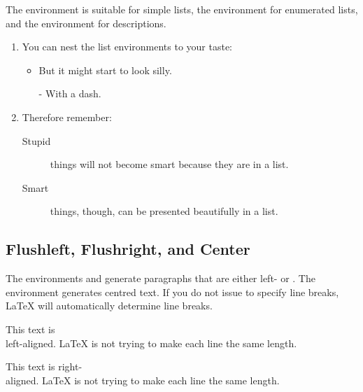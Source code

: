 The  environment is suitable for simple lists, the
 environment for enumerated lists, and the
 environment for descriptions.

\begin{example}
\flushleft
\begin{enumerate}
\item You can nest the list
environments to your taste:
\begin{itemize}
\item But it might start to
look silly.
\item[-] With a dash.
\end{itemize}
\item Therefore remember:
\begin{description}
\item[Stupid] things will not
become smart because they are
in a list.
\item[Smart] things, though,
can be presented beautifully
in a list.
\end{description}
\end{enumerate}
\end{example}

\subsection{Flushleft, Flushright, and Center}

The environments  and  generate
paragraphs that are either left- or .  The  environment generates centred text. If you
do not issue \ci{\bs} to specify line breaks, \LaTeX{} will
automatically determine line breaks.

\begin{example}
\begin{flushleft}
This text is\\ left-aligned.
\LaTeX{} is not trying to make
each line the same length.
\end{flushleft}
\end{example}

\begin{example}
\begin{flushright}
This text is right-\\aligned.
\LaTeX{} is not trying to make
each line the same length.
\end{flushright}
\end{example}

